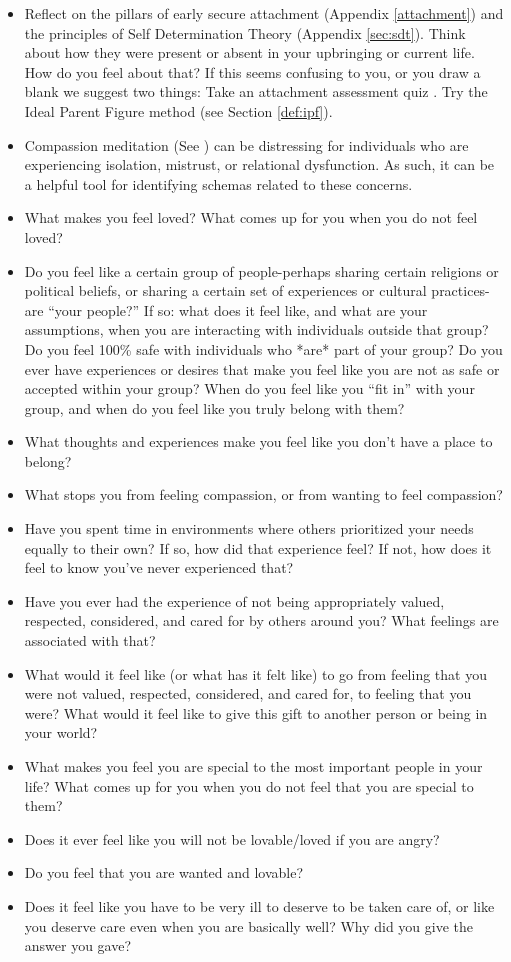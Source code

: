 \documentclass[12pt,letterpaper]{book}
\begin{document}
\begin{itemize}
    \item Reflect on the pillars of early secure attachment (Appendix \ref{attachment}) and the principles of Self Determination Theory (Appendix \ref{sec:sdt}). Think about how they were present or absent in your upbringing or current life. How do you feel about that? If this seems confusing to you, or you draw a blank we suggest two things: Take an attachment assessment quiz \cite{attachmentProject}. Try the Ideal Parent Figure method (see Section \ref{def:ipf}).
    \item Compassion meditation (See \textcite{lkMeditation}) can be distressing for individuals who are experiencing isolation, mistrust, or relational dysfunction. As such, it can be a helpful tool for identifying schemas related to these concerns.
    \item What makes you feel loved? What comes up for you when you do not feel loved?
    \item Do you feel like a certain group of people-perhaps sharing certain religions or political beliefs, or sharing a certain set of experiences or cultural practices-are “your people?” If so: what does it feel like, and what are your assumptions, when you are interacting with individuals outside that group? Do you feel 100\% safe with individuals who *are* part of your group? Do you ever have experiences or desires that make you feel like you are not as safe or accepted within your group? When do you feel like you “fit in” with your group, and when do you feel like you truly belong with them?
    \item What thoughts and experiences make you feel like you don't have a place to belong?
    \item What stops you from feeling compassion, or from wanting to feel compassion?
    \item Have you spent time in environments where others prioritized your needs equally to their own? If so, how did that experience feel? If not, how does it feel to know you've never experienced that?
    \item Have you ever had the experience of not being appropriately valued, respected, considered, and cared for by others around you? What feelings are associated with that?
    \item What would it feel like (or what has it felt like) to go from feeling that you were not valued, respected, considered, and cared for, to feeling that you were? What would it feel like to give this gift to another person or being in your world?
    \item What makes you feel you are special to the most important people in your life? What comes up for you when you do not feel that you are special to them?
    \item Does it ever feel like you will not be lovable/loved if you are angry?
    \item Do you feel that you are wanted and lovable?
    \item Does it feel like you have to be very ill to deserve to be taken care of, or like you deserve care even when you are basically well? Why did you give the answer you gave?
\end{itemize}
\end{document}
